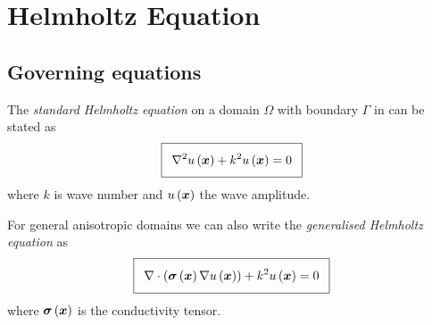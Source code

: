 \section{Helmholtz Equation}
\label{sec:HelmholtzEquations}

\subsection{Governing equations}

The \emph{standard Helmholtz equation}  on a domain $\Omega$ with boundary $\Gamma$
in \OpenCMISS can be stated as
\begin{equation}
  \addtolength{\fboxsep}{5pt}
  \boxed{
    \laplacian{}{\fnof{u}{\vectr{x}}}+k^{2}\fnof{u}{\vectr{x}}=0
  }
  \label{eqn:StandardHelmholtzEquation}
\end{equation}
where $k$ is wave number and $ u\left( \boldsymbol{x} \right) $ the wave amplitude.

For general anisotropic domains we can also write the \emph{generalised
  Helmholtz equation} as
\begin{equation}
  \addtolength{\fboxsep}{5pt}
  \boxed{
    \divergence{}{\pbrac{\fnof{\tensortwo{\sigma}}{\vectr{x}}\gradient{}{\fnof{u}{\vectr{x}}}}}+k^{2}\fnof{u}{\vectr{x}}=0
  }
  \label{eqn:GeneralisedHelmholtzEquation}
\end{equation}
where $ \boldsymbol{\mathit{\sigma}}\left( \boldsymbol{x} \right) $ is the conductivity tensor.

